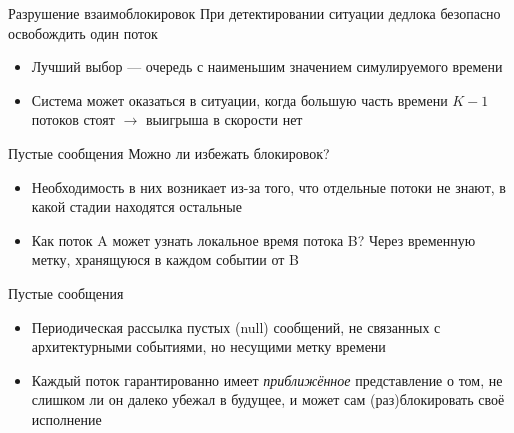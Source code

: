 \documentclass{beamer}
\begin{document}
\begin{frame}{Разрушение взаимоблокировок}
При детектировании ситуации дедлока безопасно освобождить один поток

\begin{itemize}
\item Лучший выбор — очередь с наименьшим значением симулируемого времени
\item Система может оказаться в ситуации, когда большую часть времени $K-1$ потоков стоят $\rightarrow$ выигрыша в скорости нет
\end{itemize}

\end{frame}

\begin{frame}{Пустые сообщения}
Можно ли избежать блокировок?

\begin{itemize}
    \item Необходимость в них возникает из-за того, что отдельные потоки не знают, в какой стадии находятся остальные
    \item Как поток A может узнать локальное время потока B? Через временную метку, хранящуюся в каждом событии от B
\end{itemize}

\end{frame}

\begin{frame}{Пустые сообщения}
\begin{itemize}
    \item Периодическая рассылка пустых (null) сообщений, не связанных с архитектурными событиями, но несущими метку времени
    \item Каждый поток гарантированно имеет \textit{приближённое} представление о том, не слишком ли он далеко убежал в будущее, и может сам (раз)блокировать своё исполнение
\end{itemize}

\end{frame}
\end{document}
